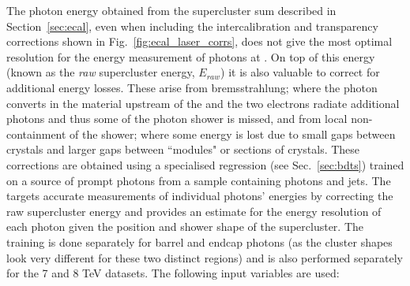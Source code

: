 The photon energy obtained from the supercluster sum described in Section~\ref{sec:ecal}, even when including the intercalibration and transparency corrections shown in Fig.~\ref{fig:ecal_laser_corrs}, does not give the most optimal resolution for the energy measurement of photons at \CMS. On top of this energy (known as the \emph{raw} supercluster energy, $E_{raw}$) it is also valuable to correct for additional energy losses. These arise from bremsstrahlung; where the photon converts in the material upstream of the \ECAL and the two electrons radiate additional photons and thus some of the photon shower is missed, and from local non-containment of the shower; where some energy is lost due to small gaps between \ECAL crystals and larger gaps between ``modules" or sections of crystals. These corrections are obtained using a specialised regression \BDT (see Sec.~\ref{sec:bdts}) trained on a \MC source of prompt photons from a sample containing photons and jets. The \BDT targets accurate measurements of individual photons' energies by correcting the raw supercluster energy and provides an estimate for the energy resolution of each photon given the position and shower shape of the supercluster. The training is done separately for barrel and endcap photons (as the cluster shapes look very different for these two distinct regions) and is also performed separately for the 7 and 8 TeV datasets. The following input variables are used:
